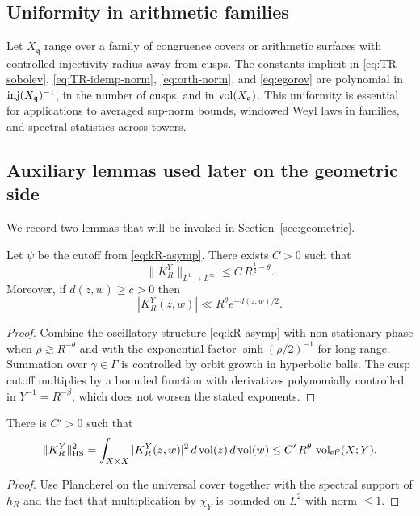 \subsection{Uniformity in arithmetic families}\label{subsec:proj-families}
Let $X_\mathfrak{q}$ range over a family of congruence covers or arithmetic surfaces with controlled injectivity radius away from cusps.
The constants implicit in \eqref{eq:TR-sobolev}, \eqref{eq:TR-idemp-norm}, \eqref{eq:orth-norm}, and \eqref{eq:egorov} are polynomial in $\mathrm{inj}(X_\mathfrak{q})^{-1}$, in the number of cusps, and in $\operatorname{vol}(X_\mathfrak{q})$.
This uniformity is essential for applications to averaged sup-norm bounds, windowed Weyl laws in families, and spectral statistics across towers.

\subsection{Auxiliary lemmas used later on the geometric side}\label{subsec:proj-aux}
We record two lemmas that will be invoked in Section~\ref{sec:geometric}.

\begin{lemma}\label{lem:L1-Linf}
Let $\psi$ be the cutoff from \eqref{eq:kR-asymp}.
There exists $C>0$ such that
\[
\|K_R^Y\|_{L^1\to L^\infty}\le C\,R^{\tfrac12+\theta}.
\]
Moreover, if $d(z,w)\ge c>0$ then
\[
|K_R^Y(z,w)|\ll R^\theta e^{-d(z,w)/2}.
\]
\end{lemma}

\begin{proof}
Combine the oscillatory structure \eqref{eq:kR-asymp} with non-stationary phase when $\rho\gtrsim R^{-\theta}$ and with the exponential factor $\sinh(\rho/2)^{-1}$ for long range.
Summation over $\gamma\in\Gamma$ is controlled by orbit growth in hyperbolic balls.
The cusp cutoff multiplies by a bounded function with derivatives polynomially controlled in $Y^{-1}=R^{-\beta}$, which does not worsen the stated exponents.
\end{proof}

\begin{lemma}\label{lem:HS}
There is $C'>0$ such that
\[
\|K_R^Y\|_{\mathrm{HS}}^2
=
\int_{X\times X} |K_R^Y(z,w)|^2\,d\operatorname{vol}(z)\,d\operatorname{vol}(w)
\le C'\,R^\theta\,\operatorname{vol}_{\mathrm{eff}}(X;Y).
\]
\end{lemma}

\begin{proof}
Use Plancherel on the universal cover together with the spectral support of $h_R$ and the fact that multiplication by $\chi_Y$ is bounded on $L^2$ with norm $\le 1$.
\end{proof}

